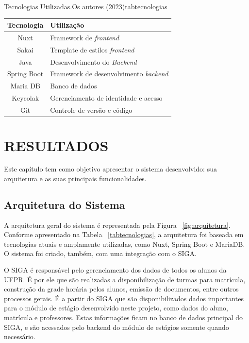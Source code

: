 \documentclass[conference,a4paper,10pt]{IEEETran}
\begin{document}
\begin{tabela}[t!]{Tecnologias Utilizadas.}{Os autores (2023)}{tabtecnologias}
  \begin{tabular}{c|l}
    \hline
    \textbf{Tecnologia}&\textbf{Utilização}\\
    \hline
    Nuxt          & Framework de \textit{frontend} \cite{nuxt2023} \\
    Sakai         & Template de estilos \textit{frontend}\cite{bhowmik2022}\\
    Java          & Desenvolvimento do \textit{Backend} \cite{oracle2023}\\
    Spring Boot   & Framework de desenvolvimento \textit{backend} \cite{spring2023}\\
    Maria DB      & Banco de dados \cite{mariadb2023} \\
    Keycolak      & Gerenciamento de identidade e acesso \cite{keycloak2023} \\
    Git           & Controle de versão e código \cite{git2023}\\
    \hline
  \end{tabular}
\end{tabela}

\section{RESULTADOS} \label{sec:resultados}

Este capítulo tem como objetivo apresentar o sistema desenvolvido: sua arquitetura e as suas principais funcionalidades.

\subsection{Arquitetura do Sistema}

A arquitetura geral do sistema é representada pela Figura ~\ref{fig:arquitetura}. Conforme apresentado na Tabela ~\ref{tabtecnologias}, a arquitetura foi baseada em tecnologias atuais e amplamente utilizadas, como Nuxt, Spring Boot e MariaDB. O sistema foi criado, também, com uma integração com o SIGA.

O SIGA é responsável pelo gerenciamento dos dados de todos os alunos da UFPR. É por ele que são realizadas a disponibilização de turmas para matrícula, construção da grade horária pelos alunos, emissão de documentos, entre outros processos gerais. É a partir do SIGA que são disponibilizados dados importantes para o módulo de estágio desenvolvido neste projeto, como dados do aluno, matrícula e professores. Estas informações ficam no banco de dados principal do SIGA, e são acessados pelo backend do módulo de estágios somente quando necessário.
\end{document}
